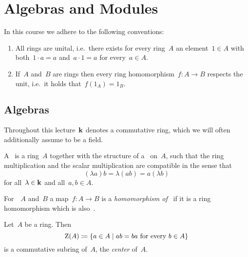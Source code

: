 \chapter{Algebras and Modules}


\begin{conventions}
  In this course we adhere to the following conventions:
  \begin{enumerate}
    \item
      All rings are unital, i.e.\ there exists for every ring~$A$ an element~$1 \in A$ with both~$1 \cdot a = a$ and~$a \cdot 1 = a$ for every~$a \in A$.
    \item
      If~$A$ and~$B$ are rings then every ring homomorphism~$f \colon A \to B$ respects the unit, i.e.\ it holds that~$f(1_A) = 1_B$.
  \end{enumerate}
\end{conventions}





\section{Algebras}


\begin{conventions}
  Throughout this lecture~$\kf$ denotes a commutative ring, which we will often additionally assume to be a field.
\end{conventions}


\begin{definition}
  A~\emph{{\kalg}} is a ring~$A$ together with the structure of a~{\module{$\kf$}} on~$A$, such that the ring multiplication and the scalar multiplication are compatible in the sense that
  \begin{equation}
    \label{compatibility of multiplications}
      (\lambda a) b
    = \lambda (ab)
    = a (\lambda b)
  \end{equation}
  for all~$\lambda \in \mathbf{k}$ and all~$a, b \in A$.
\end{definition}


\begin{definition}
  For~{\kalgs}~$A$ and~$B$ a map~$f \colon A \to B$ is a \emph{homomorphism of~{\kalgs}} if it is a ring homomorphism which is also~{\klin}.
\end{definition}


\begin{remark}
  Let~$A$ be a ring.
  Then
  \[
              \ringcenter(A)
    \defined  \{
                a \in A
              \suchthat
                \text{$ab = ba$ for every~$b \in A$}
              \}
  \]
  is a commutative subring of~$A$, the \emph{center} of~$A$.
\end{remark}


